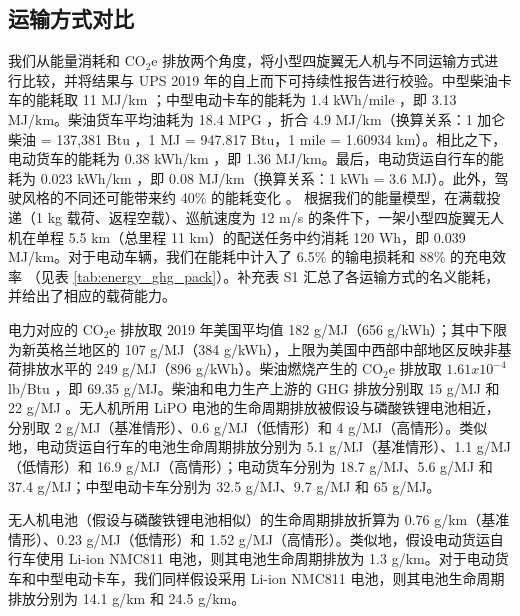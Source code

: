 \documentclass{article}
\begin{document}
\subsection{运输方式对比}
我们从能量消耗和 CO$_{2}$e 排放两个角度，将小型四旋翼无人机与不同运输方式进行比较，并将结果与 UPS 2019 年的自上而下可持续性报告进行校验。中型柴油卡车的能耗取 11 MJ/km \cite{Prohaska2016FieldTrucks}；中型电动卡车的能耗为 1.4 kWh/mile \cite{Prohaska2016FieldTrucks}，即 3.13 MJ/km。柴油货车平均油耗为 18.4 MPG \cite{AdvantageOutfitters2019BestMore}，折合 4.9 MJ/km（换算关系：1 加仑柴油 = 137,381 Btu \cite{U.S.EnergyInformationAdministrationEIA2020EnergyExplained}，1 MJ = 947.817 Btu，1 mile = 1.60934 km）。相比之下，电动货车的能耗为 0.38 kWh/km \cite{Fiori2018ModellingDataset}，即 1.36 MJ/km。最后，电动货运自行车的能耗为 0.023 kWh/km \cite{Erlandsson2017TheVan}，即 0.08 MJ/km（换算关系：1 kWh = 3.6 MJ）。此外，驾驶风格的不同还可能带来约 40\% 的能耗变化 \cite{FuelEconomyManyMPG}。 
根据我们的能量模型，在满载投递（1 kg 载荷、返程空载）、巡航速度为 12 m/s 的条件下，一架小型四旋翼无人机在单程 5.5 km（总里程 11 km）的配送任务中约消耗 120 Wh，即 0.039 MJ/km。对于电动车辆，我们在能耗中计入了 6.5\% 的输电损耗和 88\% 的充电效率 \cite{ArgonneGREETPublication2016Cradle-to-GraveTechnologies,Shiau2009ImpactVehicles, USEPA2019EmissionseGRID, U.S.EnergyInformationAdministrationEIA2021HowStates}（见表 \ref{tab:energy_ghg_pack}）。补充表 S1 汇总了各运输方式的名义能耗，并给出了相应的载荷能力。 

电力对应的 CO$_{2}$e 排放取 2019 年美国平均值 182 g/MJ（656 g/kWh）；其中下限为新英格兰地区的 107 g/MJ（384 g/kWh），上限为美国中西部中部地区反映非基荷排放水平的 249 g/MJ（896 g/kWh）\cite{USEPA2019EmissionseGRID}。柴油燃烧产生的 CO$_{2}$e 排放取 $1.61x10^{-4}$ lb/Btu \cite{U.S.EnergyInformationAdministrationEIA2020HowBurned}，即 69.35 g/MJ。柴油和电力生产上游的 GHG 排放分别取 15 g/MJ 和 22 g/MJ \cite{Laboratory2020GREET}。无人机所用 LiPO 电池的生命周期排放被假设与磷酸铁锂电池相近，分别取 2 g/MJ（基准情形）、0.6 g/MJ（低情形）和 4 g/MJ（高情形）\cite{Laboratory2020GREET}。类似地，电动货运自行车的电池生命周期排放分别为 5.1 g/MJ（基准情形）、1.1 g/MJ（低情形）和 16.9 g/MJ（高情形）；电动货车分别为 18.7 g/MJ、5.6 g/MJ 和 37.4 g/MJ；中型电动卡车分别为 32.5 g/MJ、9.7 g/MJ 和 65 g/MJ。

无人机电池（假设与磷酸铁锂电池相似）的生命周期排放折算为 0.76 g/km（基准情形）、0.23 g/MJ（低情形）和 1.52 g/MJ（高情形）。类似地，假设电动货运自行车使用 Li-ion NMC811 电池，则其电池生命周期排放为 1.3 g/km。对于电动货车和中型电动卡车，我们同样假设采用 Li-ion NMC811 电池，则其电池生命周期排放分别为 14.1 g/km 和 24.5 g/km。\cite{Laboratory2020GREET}
\end{document}
